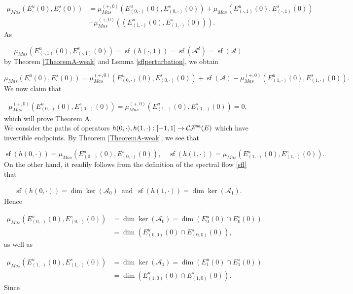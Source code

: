 \documentclass[a4paper,10pt]{article}
\DeclareMathOperator{\sfl}{sf}
\begin{document}
\begin{align*}
\mu_{Mas}(E^u_\cdot(0),E^s_\cdot(0))&=\mu^{(+,0)}_{Mas}(E^u_{(0,\cdot)}(0),E^s_{(0,\cdot)}(0))+\mu_{Mas}(E^u_{(\cdot,1)}(0),E^s_{(\cdot,1)}(0))\\
&-\mu^{(+,0)}_{Mas}((E^u_{(1,\cdot)}(0),E^s_{(1,\cdot)}(0))).
\end{align*}   
As 

\[\mu_{Mas}(E^u_{(\cdot,1)}(0),E^s_{(\cdot,1)}(0))=\sfl(h(\cdot,1))=\sfl(\mathcal{A}^\delta)=\sfl(\mathcal{A})\]
by Theorem \ref{TheoremA-weak} and Lemma \ref{sflperturbation}, we obtain

\[\mu_{Mas}(E^u_\cdot(0),E^s_\cdot(0))=\mu^{(+,0)}_{Mas}(E^u_{(0,\cdot)}(0),E^s_{(0,\cdot)}(0))+\sfl(\mathcal{A})-\mu^{(+,0)}_{Mas}(E^u_{(1,\cdot)}(0),E^s_{(1,\cdot)}(0)).\] 
We now claim that

\begin{align}\label{final-kernel}
\mu^{(+,0)}_{Mas}(E^u_{(0,\cdot)}(0),E^s_{(0,\cdot)}(0))=\mu^{(+,0)}_{Mas}(E^u_{(1,\cdot)}(0),E^s_{(1,\cdot)}(0))=0,
\end{align}
which will prove Theorem A.\\
We consider the paths of operators $h(0,\cdot), h(1,\cdot):[-1,1]\rightarrow\mathcal{CF}^\textup{sa}(E)$ which have invertible endpoints. By Theorem \ref{TheoremA-weak}, we see that 

\[\sfl(h(0,\cdot))=\mu_{Mas}(E^u_{(0,\cdot)}(0),E^s_{(0,\cdot)}(0)),\quad \sfl(h(1,\cdot))=\mu_{Mas}(E^u_{(1,\cdot)}(0),E^s_{(1,\cdot)}(0)).\]  
On the other hand, it readily follows from the definition of the spectral flow \eqref{sfl} that

\begin{align*}
\sfl(h(0,\cdot))=\dim\ker(\mathcal{A}_0) \,\text{ and }\, \sfl(h(1,\cdot))=\dim\ker(\mathcal{A}_1).
\end{align*}
Hence

\begin{align*}
\mu_{Mas}(E^u_{(0,\cdot)}(0),E^s_{(0,\cdot)}(0))&=\dim\ker(\mathcal{A}_0)=\dim(E^u_0(0)\cap E^s_0(0))\\
&=\dim(E^u_{(0,0)}(0)\cap E^s_{(0,0)}(0)),
\end{align*}
as well as

\begin{align*}
\mu_{Mas}(E^u_{(1,\cdot)}(0),E^s_{(1,\cdot)}(0))&=\dim\ker(\mathcal{A}_1)=\dim(E^u_1(0)\cap E^s_1(0))\\
&=\dim(E^u_{(1,0)}(0)\cap E^s_{(1,0)}(0)).
\end{align*}
Since
\end{document}
